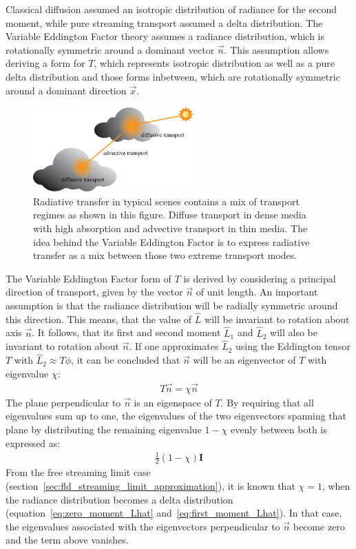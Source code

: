 Classical diffusion assumed an isotropic distribution of radiance for the second moment, while pure streaming transport assumed a delta distribution. The Variable Eddington Factor theory assumes a radiance distribution, which is rotationally symmetric around a dominant vector $\vec{n}$. This assumption allows deriving a form for $T$, which represents isotropic distribution as well as a pure delta distribution and those forms inbetween, which are rotationally symmetric around a dominant direction $\vec{x}$.
\begin{figure}[h]
\centering
\includegraphics[width=0.55\textwidth]{06_fld/figures/fig_transport_regimes_scene.pdf}
\caption{Radiative transfer in typical scenes contains a mix of transport regimes as shown in this figure. Diffuse transport in dense media with high absorption and advective transport in thin media. The idea behind the Variable Eddington Factor is to express radiative transfer as a mix between those two extreme transport modes.}
\label{fig:fld_vef_advection_diffusion2}
\end{figure}

The Variable Eddington Factor form of $T$ is derived by considering a principal direction of transport, given by the vector $\vec{n}$ of unit length. An important assumption is that the radiance distribution will be radially symmetric around this direction. This means, that the value of $\hat{L}$ will be invariant to rotation about axis $\vec{n}$. It follows, that its first and second moment $\hat{L}_1$ and $\hat{L}_2$ will also be invariant to rotation about $\vec{n}$. If one approximates $\hat{L}_2$ using the Eddington tensor $T$ with $\hat{L}_2\approx T\phi$, it can be concluded that $\vec{n}$ will be an eigenvector of $T$ with eigenvalue $\chi$:
\begin{align*}
T\vec{n} = \chi\vec{n}
\end{align*}
The plane perpendicular to $\vec{n}$ is an eigenspace of $T$. By requiring that all eigenvalues sum up to one, the eigenvalues of the two eigenvectors spanning that plane by distributing the remaining eigenvalue $1-\chi$ evenly between both is expressed as:
\begin{align}
\frac{1}{2}\left(1-\chi\right)\mathbf{I}
\label{eq:iso_var_T_isoterm}
\end{align}
From the free streaming limit case (section~\ref{sec:fld_streaming_limit_approximation}), it is known that $\chi=1$, when the radiance distribution becomes a delta distribution (equation~\ref{eq:zero_moment_Lhat} and~\ref{eq:first_moment_Lhat}). In that case, the eigenvalues associated with the eigenvectors perpendicular to $\vec{n}$ become zero and the term above vanishes.

